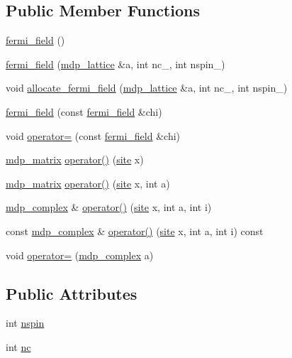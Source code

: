 \subsection*{Public Member Functions}
\begin{DoxyCompactItemize}
\item 
\hyperlink{classfermi__field_acaad044954df881d59d08b8b118b20e2}{fermi\+\_\+field} ()
\item 
\hyperlink{classfermi__field_a74efc2481ac9e64071680ebad9e93569}{fermi\+\_\+field} (\hyperlink{classmdp__lattice}{mdp\+\_\+lattice} \&a, int nc\+\_\+, int nspin\+\_)
\item 
void \hyperlink{classfermi__field_a4c185655183158f2f68edf3588d551d2}{allocate\+\_\+fermi\+\_\+field} (\hyperlink{classmdp__lattice}{mdp\+\_\+lattice} \&a, int nc\+\_\+, int nspin\+\_)
\item 
\hyperlink{classfermi__field_a91ca1df3aa4c49140191cee2816ab320}{fermi\+\_\+field} (const \hyperlink{classfermi__field}{fermi\+\_\+field} \&chi)
\item 
void \hyperlink{classfermi__field_abfaaf9b43f054fde18eaef3d80b1edf4}{operator=} (const \hyperlink{classfermi__field}{fermi\+\_\+field} \&chi)
\item 
\hyperlink{classmdp__matrix}{mdp\+\_\+matrix} \hyperlink{classfermi__field_a51ed4094b715fe01490b027513b49861}{operator()} (\hyperlink{mdp__compatibility__macros_8h_aa6f1179c424e48adef1cedf7c436eb75}{site} x)
\item 
\hyperlink{classmdp__matrix}{mdp\+\_\+matrix} \hyperlink{classfermi__field_adbdc4231bf39f4d4d350471d587b0bd0}{operator()} (\hyperlink{mdp__compatibility__macros_8h_aa6f1179c424e48adef1cedf7c436eb75}{site} x, int a)
\item 
\hyperlink{classmdp__complex}{mdp\+\_\+complex} \& \hyperlink{classfermi__field_a4f277f994dedde0d25448bb2f2a57b52}{operator()} (\hyperlink{mdp__compatibility__macros_8h_aa6f1179c424e48adef1cedf7c436eb75}{site} x, int a, int i)
\item 
const \hyperlink{classmdp__complex}{mdp\+\_\+complex} \& \hyperlink{classfermi__field_a959379c213ae582b95fa81ec343e7510}{operator()} (\hyperlink{mdp__compatibility__macros_8h_aa6f1179c424e48adef1cedf7c436eb75}{site} x, int a, int i) const
\item 
void \hyperlink{classfermi__field_a1fb7ce7e54f45a334ee55dc7250aba89}{operator=} (\hyperlink{classmdp__complex}{mdp\+\_\+complex} a)
\end{DoxyCompactItemize}
\subsection*{Public Attributes}
\begin{DoxyCompactItemize}
\item 
int \hyperlink{classfermi__field_a664546510ce0d76d234d6526c3c0282b}{nspin}
\item 
int \hyperlink{classfermi__field_a10875de82035b0689d0229ea80c8f089}{nc}
\end{DoxyCompactItemize}
